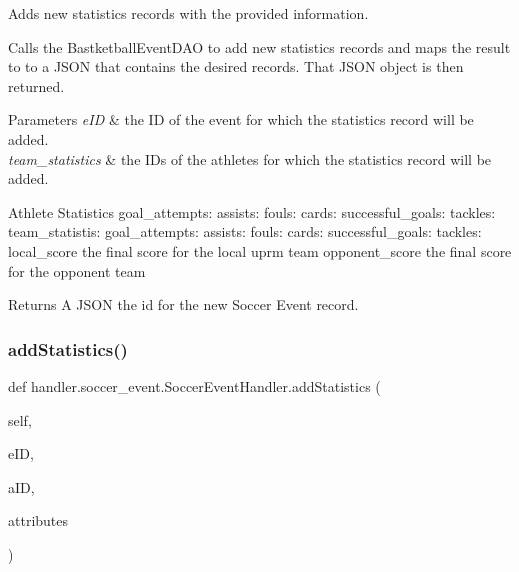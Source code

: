 Adds new statistics records with the provided information. 

Calls the Bastketball\+Event\+D\+AO to add new statistics records and maps the result to to a J\+S\+ON that contains the desired records. That J\+S\+ON object is then returned.


\begin{DoxyParams}{Parameters}
{\em e\+ID} & the ID of the event for which the statistics record will be added. \\
\hline
{\em team\+\_\+statistics} & the I\+Ds of the athletes for which the statistics record will be added.\\
\hline
\end{DoxyParams}
\begin{DoxyParagraph}{Athlete Statistics}
goal\+\_\+attempts\+: assists\+: fouls\+: cards\+: successful\+\_\+goals\+: tackles\+: team\+\_\+statistis\+: goal\+\_\+attempts\+: assists\+: fouls\+: cards\+: successful\+\_\+goals\+: tackles\+: local\+\_\+score the final score for the local uprm team opponent\+\_\+score the final score for the opponent team
\end{DoxyParagraph}
\begin{DoxyReturn}{Returns}
A J\+S\+ON the id for the new Soccer Event record. 
\end{DoxyReturn}
\mbox{\label{classhandler_1_1soccer__event_1_1_soccer_event_handler_a5b83ffd31f33b20729be14b58ebfa117}} 
\subsubsection{\texorpdfstring{add\+Statistics()}{addStatistics()}}
{\footnotesize\ttfamily def handler.\+soccer\+\_\+event.\+Soccer\+Event\+Handler.\+add\+Statistics (\begin{DoxyParamCaption}\item[{}]{self,  }\item[{}]{e\+ID,  }\item[{}]{a\+ID,  }\item[{}]{attributes }\end{DoxyParamCaption})}



